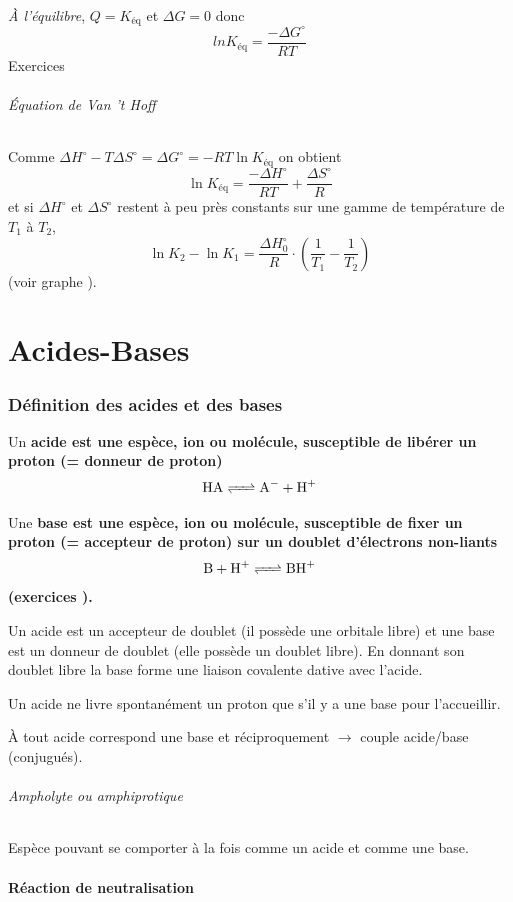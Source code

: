 \documentclass[11pt,a4paper,french]{article}
\renewcommand{\textbf}[1]{\begingroup\bfseries\mathversion{bold}#1\endgroup}
\newcommand\keq{\ensuremath{K_{\mathrm{éq}}}}
\begin{document}
\emph{À l'équilibre}, $Q=\keq$ et $\Delta G=0$ donc
\[ ln \keq=\frac{-\Delta G^{\circ}}{RT} \]
Exercices \cite[pp.~50,51,54,56-58]{legras}

\paragraph{\'Equation de Van 't Hoff}
Comme $\Delta H^{\circ}-T\Delta S^{\circ}=\Delta G^{\circ}=-RT\ln \keq$ on obtient
\[ \ln \keq=\frac{-\Delta H^{\circ}}{RT}+\frac{\Delta S^{\circ}}{R} \]
et si $\Delta H^{\circ}$ et $\Delta S^{\circ}$ restent à peu près constants sur une gamme de température de $T_1$ à $T_2$,
\[ \ln{K_2}-\ln{K_1}=\frac{\Delta H^{\circ}_0}{R}\cdot\left(\frac{1}{T_1}-\frac{1}{T_2}\right) \]
(voir graphe \cite[p.~56]{legras}).

\part{Acides-Bases}
\section{Définition des acides et des bases}



Un \textbf{acide} est une espèce, ion ou molécule, susceptible de libérer un proton  (= donneur de proton)
\[ \ce{HA <=> A- + H+} \]

Une \textbf{base} est une espèce, ion ou molécule, susceptible de fixer un proton  (= accepteur de proton) sur un doublet d'électrons non-liants
\[ \ce{B + H+ <=> BH+} \]
(exercices \cite[p.~6]{godard}).

Un acide est un accepteur de doublet (il possède une orbitale libre) et une base est un donneur de doublet (elle possède un doublet libre).
En donnant son doublet libre la base forme une liaison covalente dative avec l'acide.

Un acide ne livre spontanément un proton que s'il y a une base pour l'accueillir.

À tout acide correspond une base et réciproquement $\rightarrow$ couple acide/base (conjugués).

\paragraph{Ampholyte ou amphiprotique}
Espèce pouvant se comporter à la fois comme un acide et comme une base.

\subsection{Réaction de neutralisation}
\end{document}
